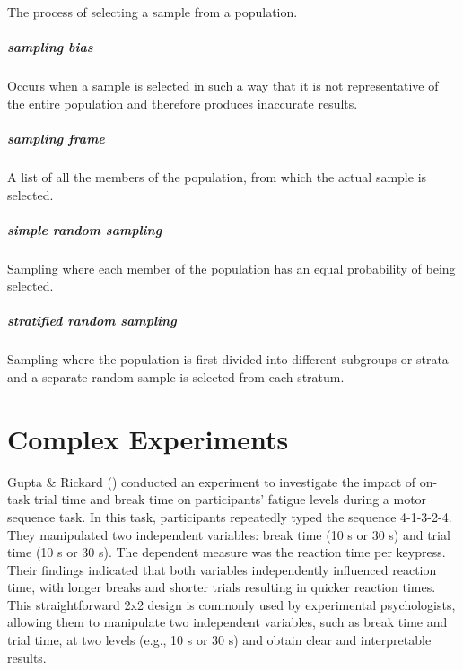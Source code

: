 \documentclass[
]{krantz}
\begin{document}
The process of selecting a sample from a population.

\paragraph*{sampling bias}\label{sampling-bias-1}

Occurs when a sample is selected in such a way that it is not representative of the entire population and therefore produces inaccurate results.

\paragraph*{sampling frame}\label{sampling-frame}

A list of all the members of the population, from which the actual sample is selected.

\paragraph*{simple random sampling}\label{simple-random-sampling}

Sampling where each member of the population has an equal probability of being selected.

\paragraph*{stratified random sampling}\label{stratified-random-sampling}

Sampling where the population is first divided into different subgroups or strata and a separate random sample is selected from each stratum.

\chapter{Complex Experiments}\label{complex-experiments}

Gupta \& Rickard () conducted an experiment to investigate the impact of on-task trial time and break time on participants' fatigue levels during a motor sequence task. In this task, participants repeatedly typed the sequence 4-1-3-2-4. They manipulated two independent variables: break time (10 s or 30 s) and trial time (10 s or 30 s). The dependent measure was the reaction time per keypress. Their findings indicated that both variables independently influenced reaction time, with longer breaks and shorter trials resulting in quicker reaction times. This straightforward 2x2 design is commonly used by experimental psychologists, allowing them to manipulate two independent variables, such as break time and trial time, at two levels (e.g., 10 s or 30 s) and obtain clear and interpretable results.
\end{document}
